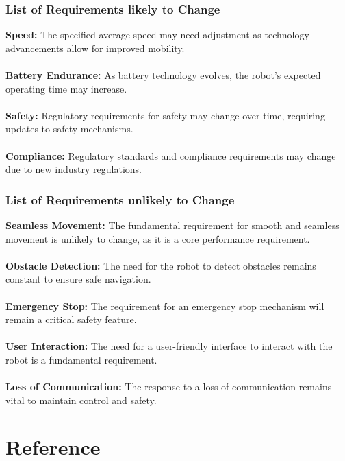 \documentclass[12pt]{article}
\begin{document}
    \subsubsection{List of Requirements likely to Change}
    \noindent\textbf{Speed: }The specified average speed may need adjustment as technology advancements allow for improved mobility.\\\\
    \noindent\textbf{Battery Endurance: }As battery technology evolves, the robot's expected operating time may increase.\\\\
    \noindent\textbf{Safety: }Regulatory requirements for safety may change over time, requiring updates to safety mechanisms.\\\\
    \noindent\textbf{Compliance: }Regulatory standards and compliance requirements may change due to new industry regulations.
    \subsubsection{List of Requirements unlikely to Change}
    \noindent\textbf{Seamless Movement: }The fundamental requirement for smooth and seamless movement is unlikely to change, as it is a core performance requirement.\\\\
    \noindent\textbf{Obstacle Detection: }The need for the robot to detect obstacles remains constant to ensure safe navigation.\\\\
    \noindent\textbf{Emergency Stop: } The requirement for an emergency stop mechanism will remain a critical safety feature.\\\\
    \noindent\textbf{User Interaction: } The need for a user-friendly interface to interact with the robot is a fundamental requirement.\\\\
    \noindent\textbf{Loss of Communication: }The response to a loss of communication remains vital to maintain control and safety.

\newpage
\section{Reference}
\end{document}

